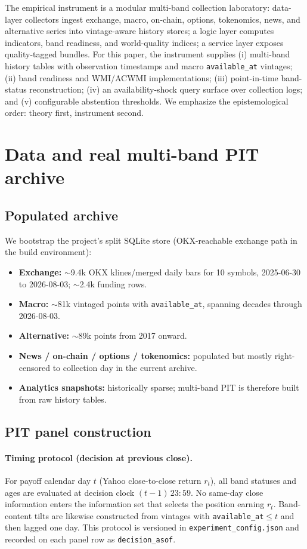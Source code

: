 \documentclass[12pt]{article}
\begin{document}
The empirical instrument is a modular multi-band collection laboratory: data-layer collectors ingest exchange, macro, on-chain, options, tokenomics, news, and alternative series into vintage-aware history stores; a logic layer computes indicators, band readiness, and world-quality indices; a service layer exposes quality-tagged bundles. For this paper, the instrument supplies (i) multi-band history tables with observation timestamps and macro \texttt{available\_at} vintages; (ii) band readiness and WMI/ACWMI implementations; (iii) point-in-time band-status reconstruction; (iv) an availability-shock query surface over collection logs; and (v) configurable abstention thresholds. We emphasize the epistemological order: theory first, instrument second.

\section{Data and real multi-band PIT archive}
\label{sec:data}

\subsection{Populated archive}
We bootstrap the project's split SQLite store (OKX-reachable exchange path in the build environment):
\begin{itemize}[leftmargin=1.4em]
\item \textbf{Exchange:} $\sim$9.4k OKX klines/merged daily bars for 10 symbols, 2025-06-30 to 2026-08-03; $\sim$2.4k funding rows.
\item \textbf{Macro:} $\sim$81k vintaged points with \texttt{available\_at}, spanning decades through 2026-08-03.
\item \textbf{Alternative:} $\sim$89k points from 2017 onward.
\item \textbf{News / on-chain / options / tokenomics:} populated but mostly right-censored to collection day in the current archive.
\item \textbf{Analytics snapshots:} historically sparse; multi-band PIT is therefore built from raw history tables.
\end{itemize}

\subsection{PIT panel construction}
\paragraph{Timing protocol (decision at previous close).}
For payoff calendar day $t$ (Yahoo close-to-close return $r_t$), all band statuses and ages are evaluated at decision clock $(t-1)\,23{:}59$. No same-day close information enters the information set that selects the position earning $r_t$. Band-content tilts are likewise constructed from vintages with \texttt{available\_at}$\le t$ and then lagged one day. This protocol is versioned in \texttt{experiment\_config.json} and recorded on each panel row as \texttt{decision\_asof}.
\end{document}
